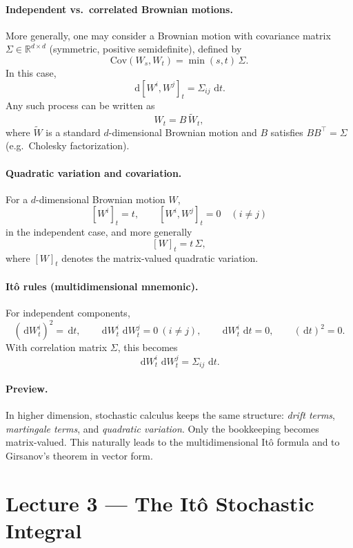 \documentclass[11pt]{article}
\newcommand{\R}{\mathbb{R}}
\newcommand{\Cov}{\mathrm{Cov}}
\newcommand{\dd}{\,\mathrm{d}}
\newcommand{\1}{\mathbf{1}}
\theoremstyle{plain}
\theoremstyle{definition}
\theoremstyle{remark}
\begin{document}
\paragraph{Independent vs.\ correlated Brownian motions.}
More generally, one may consider a Brownian motion with covariance matrix
$\Sigma\in\R^{d\times d}$ (symmetric, positive semidefinite), defined by
\[
\Cov(W_s,W_t)=\min(s,t)\,\Sigma.
\]
In this case,
\[
\dd[W^i,W^j]_t=\Sigma_{ij}\,\dd t.
\]
Any such process can be written as
\[
W_t = B\,\widetilde W_t,
\]
where $\widetilde W$ is a standard $d$-dimensional Brownian motion
and $B$ satisfies $BB^\top=\Sigma$ (e.g.\ Cholesky factorization).

\paragraph{Quadratic variation and covariation.}
For a $d$-dimensional Brownian motion $W$,
\[
[W^i]_t = t,
\qquad
[W^i,W^j]_t = 0 \quad (i\neq j)
\]
in the independent case, and more generally
\[
[W]_t = t\,\Sigma,
\]
where $[W]_t$ denotes the matrix-valued quadratic variation.

\paragraph{It\^o rules (multidimensional mnemonic).}
For independent components,
\[
(\dd W_t^i)^2=\dd t,
\qquad
\dd W_t^i\,\dd W_t^j=0 \ (i\neq j),
\qquad
\dd W_t^i\,\dd t=0,
\qquad
(\dd t)^2=0.
\]
With correlation matrix $\Sigma$, this becomes
\[
\dd W_t^i\,\dd W_t^j=\Sigma_{ij}\,\dd t.
\]

\paragraph{Preview.}
In higher dimension, stochastic calculus keeps the same structure:
\emph{drift terms}, \emph{martingale terms}, and \emph{quadratic variation}.
Only the bookkeeping becomes matrix-valued.
This naturally leads to the multidimensional It\^o formula
and to Girsanov’s theorem in vector form.



\section{Lecture 3 --- The Itô Stochastic Integral}
\end{document}
